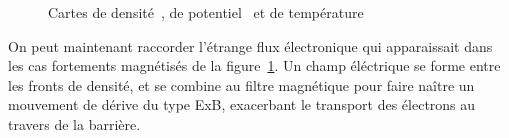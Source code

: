 \begin{refsection}
	\begin{figure}[!htbp]
  \centering
    \caption{Cartes de densité~, de
    potentiel~ et de
    température}
    \label{4-PegasesCarteDensiteVarBiasWave}
\end{figure}

On peut maintenant raccorder l'étrange flux électronique qui apparaissait dans
les cas fortements magnétisés de la
figure~\ref{4-PegasesCarteDensiteVarBiasWave}. Un champ éléctrique se forme
entre les fronts de densité, et se combine au filtre
magnétique pour faire naître un mouvement de dérive du type ExB, exacerbant le
transport des électrons au travers de la barrière. 


\end{refsection}
